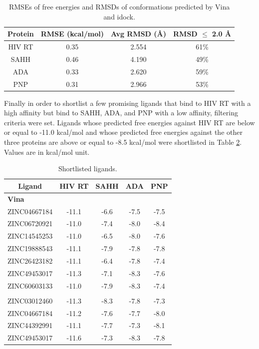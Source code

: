 \begin{table}
\centering
\begin{tabular*}
{\linewidth}
{@{\extracolsep{\fill}}cccc}
\toprule
Protein & RMSE (kcal/mol) & Avg RMSD (\AA) & RMSD $\leq$ 2.0 \AA\\
\midrule
HIV RT & 0.35 & 2.554 & 61\%\\
SAHH   & 0.46 & 4.190 & 49\%\\
ADA    & 0.33 & 2.620 & 59\%\\
PNP    & 0.31 & 2.966 & 53\%\\
\bottomrule
\end{tabular*}
\caption{RMSEs of free energies and RMSDs of conformations predicted by Vina and idock.}
\label{idock:RMSEAndRMSD}
\end{table}

Finally in order to shortlist a few promising ligands that bind to HIV RT with a high affinity but bind to SAHH, ADA, and PNP with a low affinity, filtering criteria were set. Ligands whose predicted free energies against HIV RT are below or equal to -11.0 kcal/mol and whose predicted free energies against the other three proteins are above or equal to -8.5 kcal/mol were shortlisted in Table \ref{idock:ShortlistedLigands}. Values are in kcal/mol unit.

\begin{table}
\centering
\begin{tabular*}
{\linewidth}
{@{\extracolsep{\fill}}ccccc}
\toprule
Ligand & HIV RT & SAHH & ADA & PNP\\
\midrule
\multicolumn{5}{l}{\textbf{Vina}}\\
ZINC04667184 & -11.1 & -6.6 & -7.5 & -7.5\\
ZINC06720921 & -11.0 & -7.4 & -8.0 & -8.4\\
ZINC14545253 & -11.0 & -6.5 & -8.0 & -7.6\\
ZINC19888543 & -11.1 & -7.9 & -7.8 & -7.8\\
ZINC26423182 & -11.1 & -6.4 & -7.8 & -7.4\\
ZINC49453017 & -11.3 & -7.1 & -8.3 & -7.6\\
ZINC60603133 & -11.0 & -7.9 & -8.3 & -7.4\\
\noalign{\smallskip\smallskip}
\multicolumn{5}{l}{\textbf{idock}}\\
ZINC03012460 & -11.3 & -8.3 & -7.8 & -7.3\\
ZINC04667184 & -11.2 & -7.6 & -7.7 & -8.0\\
ZINC44392991 & -11.1 & -7.7 & -7.3 & -8.1\\
ZINC49453017 & -11.6 & -7.3 & -8.3 & -7.8\\
\bottomrule
\end{tabular*}
\caption{Shortlisted ligands.}
\label{idock:ShortlistedLigands}
\end{table}

